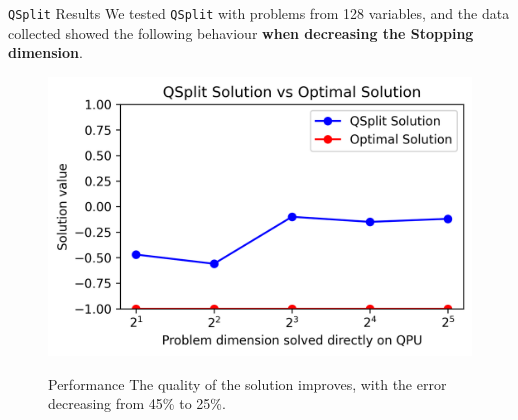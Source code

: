\begin{block}{\texttt{QSplit} Results}
    We tested \texttt{QSplit} with problems from 128 variables, and the data collected showed the following behaviour \textbf{when decreasing the Stopping dimension}.

    \begin{figure}[h!]
        \centering
        \begin{minipage}{0.55\textwidth}
            \centering
            \includegraphics[height=0.14\textheight]{logos/sol.png}
        \end{minipage}%
        \hfill
        \begin{minipage}{0.4\textwidth}
            \begin{alertblock}{Performance}
                The quality of the solution improves, with the error decreasing from 45\% to 25\%.
            \end{alertblock}
        \end{minipage}
    \end{figure}


\end{block}
